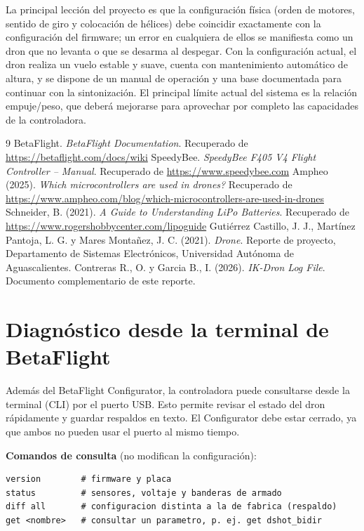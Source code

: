 \documentclass[11pt,letterpaper]{article}
\begin{document}
La principal lección del proyecto es que la configuración física (orden de motores, sentido de giro y colocación de hélices) debe coincidir exactamente con la configuración del firmware; un error en cualquiera de ellos se manifiesta como un dron que no levanta o que se desarma al despegar. Con la configuración actual, el dron realiza un vuelo estable y suave, cuenta con mantenimiento automático de altura, y se dispone de un manual de operación y una base documentada para continuar con la sintonización. El principal límite actual del sistema es la relación empuje/peso, que deberá mejorarse para aprovechar por completo las capacidades de la controladora.

\begin{thebibliography}{9}
 BetaFlight. \textit{BetaFlight Documentation}. Recuperado de \url{https://betaflight.com/docs/wiki}
 SpeedyBee. \textit{SpeedyBee F405 V4 Flight Controller -- Manual}. Recuperado de \url{https://www.speedybee.com}
 Ampheo (2025). \textit{Which microcontrollers are used in drones?} Recuperado de \url{https://www.ampheo.com/blog/which-microcontrollers-are-used-in-drones}
 Schneider, B. (2021). \textit{A Guide to Understanding LiPo Batteries}. Recuperado de \url{https://www.rogershobbycenter.com/lipoguide}
 Gutiérrez Castillo, J. J., Martínez Pantoja, L. G. y Mares Montañez, J. C. (2021). \textit{Drone}. Reporte de proyecto, Departamento de Sistemas Electrónicos, Universidad Autónoma de Aguascalientes.
 Contreras R., O. y Garcia B., I. (2026). \textit{IK-Dron Log File}. Documento complementario de este reporte.
\end{thebibliography}

\appendix
\section{Diagnóstico desde la terminal de BetaFlight}
\label{anx:cli}
Además del BetaFlight Configurator, la controladora puede consultarse desde la terminal (CLI) por el puerto USB. Esto permite revisar el estado del dron rápidamente y guardar respaldos en texto. El Configurator debe estar cerrado, ya que ambos no pueden usar el puerto al mismo tiempo.

\noindent\textbf{Comandos de consulta} (no modifican la configuración):
\begin{lstlisting}
version        # firmware y placa
status         # sensores, voltaje y banderas de armado
diff all       # configuracion distinta a la de fabrica (respaldo)
get <nombre>   # consultar un parametro, p. ej. get dshot_bidir
\end{lstlisting}
\end{document}
